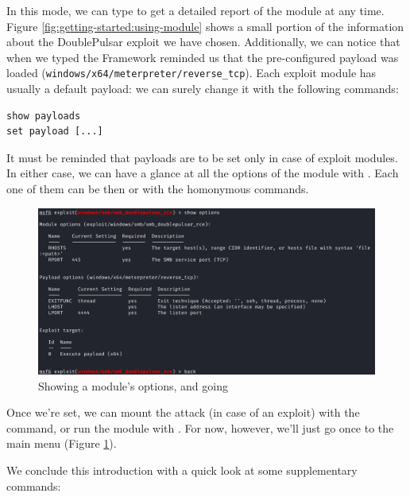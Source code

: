 In this mode, we can type  to get a detailed report of the module at any time. Figure \ref{fig:getting-started:using-module} shows a small portion of the information about the DoublePulsar exploit we have chosen. Additionally, we can notice that when we typed  the Framework reminded us that the pre-configured payload was loaded (\texttt{windows/x64/meterpreter/reverse\_tcp}). Each exploit module has usually a default payload: we can surely change it with the following commands:

\begin{lstlisting}
show payloads
set payload [...]
\end{lstlisting}

It must be reminded that payloads are to be set only in case of exploit modules. In either case, we can have a glance at all the options of the module with . Each one of them can be then  or  with the homonymous commands.

\begin{figure}[htbp]
	\centering
	\includegraphics[width=\textwidth]{../drawable/preliminaries_screenshots/options-eternalblue.png}
    \caption{Showing a module's options, and going }
    \label{fig:getting-started:options-back}
\end{figure}


Once we're set, we can mount the attack (in case of an exploit) with the  command, or run the module with . For now, however, we'll just go  once to the main menu (Figure \ref{fig:getting-started:options-back}).

We conclude this introduction with a quick look at some supplementary commands:

